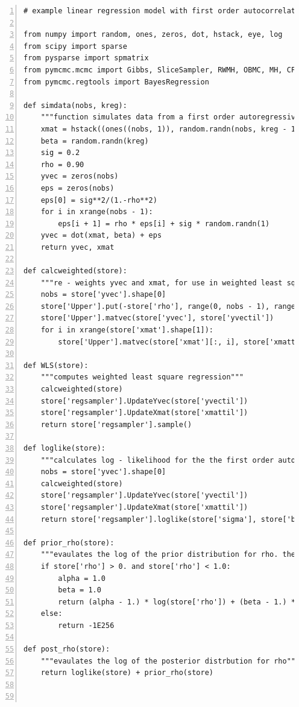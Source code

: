 \documentclass[article]{jss}
\begin{document}
\begin{lstlisting}[basicstyle={\scriptsize},numbers=left,tabsize=4]
# example linear regression model with first order autocorrelation in the errors

from numpy import random, ones, zeros, dot, hstack, eye, log
from scipy import sparse
from pysparse import spmatrix
from pymcmc.mcmc import Gibbs, SliceSampler, RWMH, OBMC, MH, CFsampler
from pymcmc.regtools import BayesRegression 

def simdata(nobs, kreg):
    """function simulates data from a first order autoregressive regression"""
    xmat = hstack((ones((nobs, 1)), random.randn(nobs, kreg - 1)))
    beta = random.randn(kreg)
    sig = 0.2
    rho = 0.90
    yvec = zeros(nobs)
    eps = zeros(nobs)
    eps[0] = sig**2/(1.-rho**2)
    for i in xrange(nobs - 1):
        eps[i + 1] = rho * eps[i] + sig * random.randn(1)
    yvec = dot(xmat, beta) + eps
    return yvec, xmat

def calcweighted(store):
    """re - weights yvec and xmat, for use in weighted least squares regression"""
    nobs = store['yvec'].shape[0]
    store['Upper'].put(-store['rho'], range(0, nobs - 1), range(1, nobs))
    store['Upper'].matvec(store['yvec'], store['yvectil'])
    for i in xrange(store['xmat'].shape[1]):
        store['Upper'].matvec(store['xmat'][:, i], store['xmattil'][:, i])

def WLS(store):
    """computes weighted least square regression"""
    calcweighted(store)
    store['regsampler'].UpdateYvec(store['yvectil'])
    store['regsampler'].UpdateXmat(store['xmattil'])
    return store['regsampler'].sample()

def loglike(store):
    """calculates log - likelihood for the the first order autoregressive regression model"""
    nobs = store['yvec'].shape[0]
    calcweighted(store)
    store['regsampler'].UpdateYvec(store['yvectil'])
    store['regsampler'].UpdateXmat(store['xmattil'])
    return store['regsampler'].loglike(store['sigma'], store['beta'])

def prior_rho(store):
    """evaulates the log of the prior distribution for rho. the beta distribution is used"""
    if store['rho'] > 0. and store['rho'] < 1.0:
        alpha = 1.0
        beta = 1.0
        return (alpha - 1.) * log(store['rho']) + (beta - 1.) * log(1.-store['rho'])
    else:
        return -1E256

def post_rho(store):
    """evaulates the log of the posterior distrbution for rho"""
    return loglike(store) + prior_rho(store)



\end{lstlisting}
\end{document}
